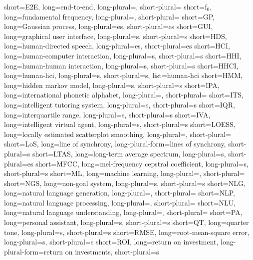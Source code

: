 	{short=E2E,		long=end-to-end,									long-plural=, short-plural=}
		{short=f$_0$,	long=fundamental frequency, 						long-plural=, short-plural=}
		{short=GP,		long=Gaussian process,								long-plural=es, short-plural=es}
	{short=GUI, 	long=graphical user interface, 						long-plural=s, short-plural=s}
	{short=HDS, 	long=human-directed speech, 						long-plural=es, short-plural=es}
	{short=HCI, 	long=human-computer interaction,					long-plural=s, short-plural=s}
	{short=HHI, 	long=human-human interaction,						long-plural=s, short-plural=s}
	{short=HHCI, 	long=human-\acl*{hci},								long-plural=s, short-plural=s, list=human-\acl*{hci}}
	{short=HMM, 	long=hidden markov model, 							long-plural=s, short-plural=s}
	{short=IPA,		long=international phonetic alphabet, 				long-plural=, short-plural=}
	{short=ITS, 	long=intelligent tutoring system, 					long-plural=s, short-plural=s}
	{short=IQR, 	long=interquartile range,							long-plural=s, short-plural=s}
	{short=IVA,		long=intelligent virtual agent, 					long-plural=s, short-plural=s}
	{short=LOESS, 	long=locally estimated scatterplot smoothing, 		long-plural=, short-plural=}
	{short=LoS, 	long=line of synchrony,								long-plural-form=lines of synchrony, short-plural=s}
	{short=LTAS, 	long=long-term average spectrum,					long-plural=s, short-plural=es}
	{short=MFCC, 	long=mel-frequency cepstral coefficient,			long-plural=s, short-plural=s}
		{short=ML, 		long=machine learning, 								long-plural=, short-plural=}
	{short=NGS, 	long=non-goal system, 								long-plural=s, short-plural=s}
	{short=NLG, 	long=natural language generation, 					long-plural=, short-plural=}
	{short=NLP, 	long=natural language processing, 					long-plural=, short-plural=}
	{short=NLU, 	long=natural language understanding, 				long-plural=, short-plural=}
		{short=PA, 		long=personal assistant, 							long-plural=s, short-plural=s}
		{short=QT,	 	long=quarter tone, long-plural=s, short-plural=s}
	{short=RMSE, 	long=root-mean-square error,						long-plural=s, short-plural=s}
	{short=ROI, 	long=return on investment,							long-plural-form=return on investments, short-plural=s}
